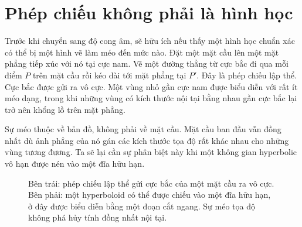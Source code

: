 \section{Phép chiếu không phải là hình học}

Trước khi chuyển sang độ cong âm, sẽ hữu ích nếu thấy một hình học chuẩn xác có thể bị một hình vẽ làm méo đến mức nào. Đặt một mặt cầu lên một mặt phẳng tiếp xúc với nó tại cực nam. Vẽ một đường thẳng từ cực bắc đi qua mỗi điểm \(P\) trên mặt cầu rồi kéo dài tới mặt phẳng tại \(P'\). Đây là phép chiếu lập thể. Cực bắc được gửi ra vô cực. Một vùng nhỏ gần cực nam được biểu diễn với rất ít méo dạng, trong khi những vùng có kích thước nội tại bằng nhau gần cực bắc lại trở nên khổng lồ trên mặt phẳng.

Sự méo thuộc về bản đồ, không phải về mặt cầu. Mặt cầu ban đầu vẫn đồng nhất dù ảnh phẳng của nó gán các kích thước tọa độ rất khác nhau cho những vùng tương đương. Ta sẽ lại cần sự phân biệt này khi một không gian hyperbolic vô hạn được nén vào một đĩa hữu hạn.

\begin{figure}[htbp]
\centering
{}%
\caption{Bên trái: phép chiếu lập thể gửi cực bắc của một mặt cầu ra vô cực. Bên phải: một hyperboloid có thể được chiếu vào một đĩa hữu hạn, ở đây được biểu diễn bằng một đoạn cắt ngang. Sự méo tọa độ không phá hủy tính đồng nhất nội tại.}
\label{fig:c03-projections}
\end{figure}

